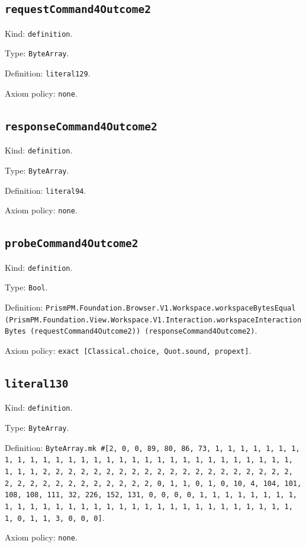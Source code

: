 \documentclass[11pt]{article}
\begin{document}
\subsection*{\texttt{requestCommand4Outcome2}}
\noindent Kind: \texttt{definition}.\par
\noindent Type: \texttt{ByteArray}.\par
\noindent Definition: \texttt{literal129}.\par
\noindent Axiom policy: \texttt{none}.\par
\subsection*{\texttt{responseCommand4Outcome2}}
\noindent Kind: \texttt{definition}.\par
\noindent Type: \texttt{ByteArray}.\par
\noindent Definition: \texttt{literal94}.\par
\noindent Axiom policy: \texttt{none}.\par
\subsection*{\texttt{probeCommand4Outcome2}}
\noindent Kind: \texttt{definition}.\par
\noindent Type: \texttt{Bool}.\par
\noindent Definition: \texttt{PrismPM.Foundation.Browser.V1.Workspace.workspaceBytesEqual (PrismPM.Foundation.View.Workspace.V1.Interaction.workspaceInteractionBytes (requestCommand4Outcome2)) (responseCommand4Outcome2)}.\par
\noindent Axiom policy: \texttt{exact [Classical.choice, Quot.sound, propext]}.\par
\subsection*{\texttt{literal130}}
\noindent Kind: \texttt{definition}.\par
\noindent Type: \texttt{ByteArray}.\par
\noindent Definition: \texttt{ByteArray.mk \#[2, 0, 0, 89, 80, 86, 73, 1, 1, 1, 1, 1, 1, 1, 1, 1, 1, 1, 1, 1, 1, 1, 1, 1, 1, 1, 1, 1, 1, 1, 1, 1, 1, 1, 1, 1, 1, 1, 1, 1, 2, 2, 2, 2, 2, 2, 2, 2, 2, 2, 2, 2, 2, 2, 2, 2, 2, 2, 2, 2, 2, 2, 2, 2, 2, 2, 2, 2, 2, 2, 2, 2, 0, 1, 1, 0, 1, 0, 10, 4, 104, 101, 108, 108, 111, 32, 226, 152, 131, 0, 0, 0, 0, 1, 1, 1, 1, 1, 1, 1, 1, 1, 1, 1, 1, 1, 1, 1, 1, 1, 1, 1, 1, 1, 1, 1, 1, 1, 1, 1, 1, 1, 1, 1, 1, 0, 1, 1, 3, 0, 0, 0]}.\par
\noindent Axiom policy: \texttt{none}.\par
\end{document}
